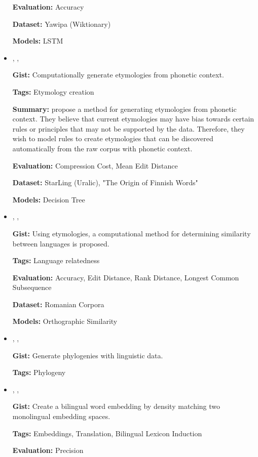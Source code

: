 \documentclass{article}[a4paper]
\newcommand{\bitem}[2]{
    \item[\cite{#1}]
        \citetitle{#1}, \citeauthor{#1}, \citeyear{#1}
        \newline
        {#2}
}%
\begin{document}
\begin{itemize}
{        \textbf{Evaluation:}
        Accuracy

        \textbf{Dataset:}
        Yawipa (Wiktionary)

        \textbf{Models:}
        LSTM
    }%

    \bitem{wettig_using_2012}%
    {%
        \textbf{Gist:}
        Computationally generate etymologies from phonetic context.

        \textbf{Tags:}
        Etymology creation

        \textbf{Summary:}
        \citeauthor{wettig_using_2012} propose a method for generating
        etymologies from phonetic context. They believe that current etymologies
        may have bias towards certain rules or principles that may not be
        supported by the data. Therefore, they wish to model rules to create
        etymologies that can be discovered automatically from the raw corpus
        with phonetic context.

        \textbf{Evaluation:}
        Compression Cost, Mean Edit Distance

        \textbf{Dataset:}
        StarLing (Uralic), "The Origin of Finnish Words"

        \textbf{Models:}
        Decision Tree
    }%

    \bitem{ciobanu_etymological_2014}%
    {%
        \textbf{Gist:}
        Using etymologies, a computational method for determining similarity
        between languages is proposed.

        \textbf{Tags:}
        Language relatedness

        \textbf{Evaluation:}
        Accuracy, Edit Distance, Rank Distance, Longest Common Subsequence

        \textbf{Dataset:}
        Romanian Corpora

        \textbf{Models:}
        Orthographic Similarity
    }%

    \bitem{nouri_alignment_2016}%
    {%
        \textbf{Gist:}
        Generate phylogenies with linguistic data.

        \textbf{Tags:}
        Phylogeny
    }%

    \bitem{zhou_density_2019}%
    {%
        \textbf{Gist:}
        Create a bilingual word embedding by density matching two monolingual
        embedding spaces.

        \textbf{Tags:}
        Embeddings, Translation, Bilingual Lexicon Induction

        \textbf{Evaluation:}
        Precision

}
\end{itemize}
\end{document}
